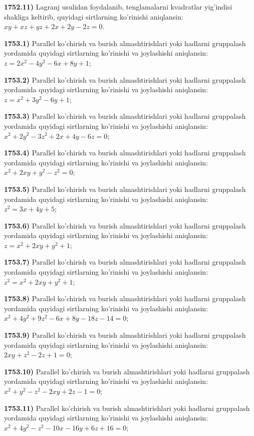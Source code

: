 \textbf{1752.11)} Lagranj usulidan foydalanib, tenglamalarni kvadratlar yig'indisi shakliga keltirib, quyidagi sirtlarning ko'rinishi aniqlansin: $xy + xz + yz + 2x + 2y - 2z = 0$.

\textbf{1753.1)} Parallel ko'chirish va burish almashtirishlari yoki hadlarni gruppalash yordamida quyidagi sirtlarning ko'rinishi va joylashishi aniqlansin: $z = 2x^{2} - 4y^{2} - 6x + 8y + 1$;

\textbf{1753.2)} Parallel ko'chirish va burish almashtirishlari yoki hadlarni gruppalash yordamida quyidagi sirtlarning ko'rinishi va joylashishi aniqlansin: $z = x^{2} + 3y^{2} - 6y + 1$;

\textbf{1753.3)} Parallel ko'chirish va burish almashtirishlari yoki hadlarni gruppalash yordamida quyidagi sirtlarning ko'rinishi va joylashishi aniqlansin: $x^{2} + 2y^{2} - 3z^{2} + 2x + 4y - 6z = 0$;

\textbf{1753.4)} Parallel ko'chirish va burish almashtirishlari yoki hadlarni gruppalash yordamida quyidagi sirtlarning ko'rinishi va joylashishi aniqlansin: $x^{2} + 2xy + y^{2} - z^{2} = 0$;

\textbf{1753.5)} Parallel ko'chirish va burish almashtirishlari yoki hadlarni gruppalash yordamida quyidagi sirtlarning ko'rinishi va joylashishi aniqlansin: $z^{2} = 3x + 4y + 5$;

\textbf{1753.6)} Parallel ko'chirish va burish almashtirishlari yoki hadlarni gruppalash yordamida quyidagi sirtlarning ko'rinishi va joylashishi aniqlansin: $z = x^{2} + 2xy + y^{2} + 1$;

\textbf{1753.7)} Parallel ko'chirish va burish almashtirishlari yoki hadlarni gruppalash yordamida quyidagi sirtlarning ko'rinishi va joylashishi aniqlansin: $z^{2} = x^{2} + 2xy + y^{2} + 1$;

\textbf{1753.8)} Parallel ko'chirish va burish almashtirishlari yoki hadlarni gruppalash yordamida quyidagi sirtlarning ko'rinishi va joylashishi aniqlansin: $x^{2} + 4y^{2} + 9z^{2} - 6x + 8y - 18z - 14 = 0$;

\textbf{1753.9)} Parallel ko'chirish va burish almashtirishlari yoki hadlarni gruppalash yordamida quyidagi sirtlarning ko'rinishi va joylashishi aniqlansin: $2xy + z^{2} - 2z + 1 = 0$;

\textbf{1753.10)} Parallel ko'chirish va burish almashtirishlari yoki hadlarni gruppalash yordamida quyidagi sirtlarning ko'rinishi va joylashishi aniqlansin: $x^{2} + y^{2} - z^{2} - 2xy + 2z - 1 = 0$;

\textbf{1753.11)} Parallel ko'chirish va burish almashtirishlari yoki hadlarni gruppalash yordamida quyidagi sirtlarning ko'rinishi va joylashishi aniqlansin: $x^{2} + 4y^{2} - z^{2} - 10x - 16y + 6z + 16 = 0$;

